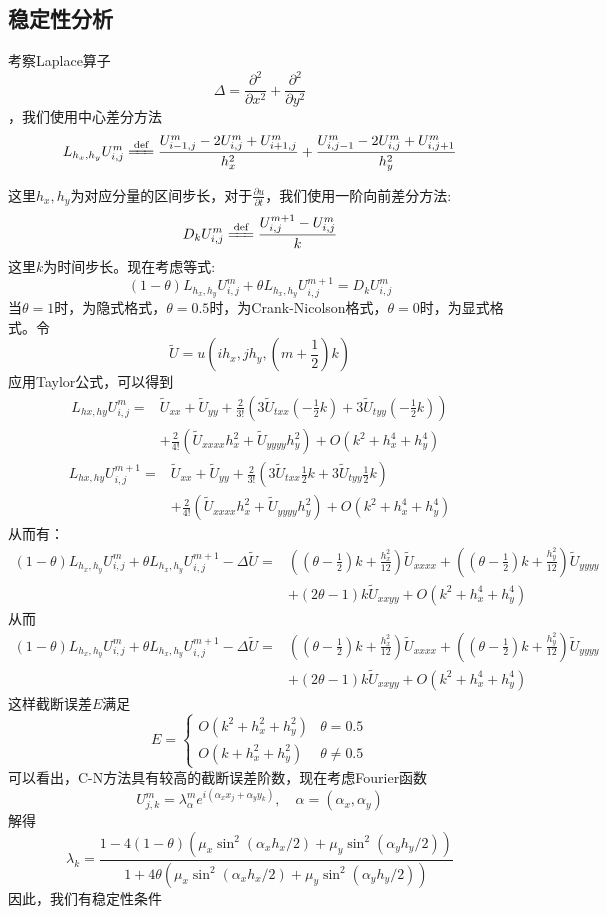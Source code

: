 \documentclass[12pt]{ctexart}
\newcommand{\eqdef}{\xlongequal{\text{def}}}%
\begin{document}
\subsection{稳定性分析}
考察Laplace算子$$\Delta = \frac{\partial^2}{\partial x^2} + \frac{\partial^2}{\partial y^2}$$，我们使用中心差分方法
$$
L_{h_x,h_y}U_{i,j}^m \eqdef \frac{U_{i-1,j}^m-2U_{i,j}^m+U_{i+1,j}^m}{h_x^2} + \frac{U_{i,j-1}^m-2U_{i,j}^m+U_{i,j+1}^m}{h_y^2}
$$

这里$h_x,h_y$为对应分量的区间步长，对于$\frac{\partial u}{\partial t}$，我们使用一阶向前差分方法:
$$
D_k U_{i,j}^m \eqdef \frac{U_{i,j}^{m+1}-U_{i,j}^m}{k}
$$
这里$k$为时间步长。现在考虑等式:
$$
(1-\theta)L_{h_x,h_y}U_{i,j}^m+\theta L_{h_x,h_y}U_{i,j}^{m+1} = D_kU_{i,j}^m
$$
当$\theta = 1$时，为隐式格式，$\theta=0.5$时，为Crank-Nicolson格式，$\theta=0$时，为显式格式。令
$$\tilde{U} = u\left(ih_x,jh_y,\left(m+\frac{1}{2}\right)k\right)$$
应用Taylor公式，可以得到
$$
\begin{aligned}
L_{hx,hy}U_{i,j}^m =& \tilde{U}_{xx} + \tilde{U}_{yy} + \frac{2}{3!}\left(3\tilde{U}_{txx}\left(-\frac{1}{2}k\right)+3\tilde{U}_{tyy}\left(-\frac{1}{2}k\right)\right) \\
&+\frac{2}{4!}\left(\tilde{U}_{xxxx}h_x^2+\tilde{U}_{yyyy}h_y^2\right)+O(k^2+h_x^4+h_y^4)
\end{aligned}
$$
$$
\begin{aligned}
L_{hx,hy}U_{i,j}^{m+1} =& \tilde{U}_{xx} + \tilde{U}_{yy} + \frac{2}{3!}\left(3\tilde{U}_{txx}\frac{1}{2}k+3\tilde{U}_{tyy}\frac{1}{2}k\right) \\
&+\frac{2}{4!}\left(\tilde{U}_{xxxx}h_x^2+\tilde{U}_{yyyy}h_y^2\right)+O(k^2+h_x^4+h_y^4)
\end{aligned}
$$
从而有：
$$
\begin{aligned}
(1-\theta)L_{h_x,h_y}U_{i,j}^m+\theta L_{h_x,h_y}U_{i,j}^{m+1} - \Delta \tilde{U} =& \left(\left(\theta - \frac{1}{2}\right)k+\frac{h_x^2}{12}\right)\tilde{U}_{xxxx}+\left(\left(\theta - \frac{1}{2}\right)k+\frac{h_y^2}{12}\right)\tilde{U}_{yyyy}\\
&+\left(2\theta - 1\right)k\tilde{U}_{xxyy} + O(k^2+h_x^4+h_y^4)
\end{aligned}
$$
从而
$$
\begin{aligned}
(1-\theta)L_{h_x,h_y}U_{i,j}^m+\theta L_{h_x,h_y}U_{i,j}^{m+1} - \Delta \tilde{U} =& \left(\left(\theta - \frac{1}{2}\right)k+\frac{h_x^2}{12}\right)\tilde{U}_{xxxx}+\left(\left(\theta - \frac{1}{2}\right)k+\frac{h_y^2}{12}\right)\tilde{U}_{yyyy}\\
&+\left(2\theta - 1\right)k\tilde{U}_{xxyy} + O(k^2+h_x^4+h_y^4)
\end{aligned}
$$
这样截断误差$E$满足
$$
E = 
\begin{cases}
O(k^2+h_x^2+h_y^2) & \theta = 0.5\\
O(k+h_x^2+h_y^2) & \theta \neq 0.5
\end{cases}
$$
可以看出，C-N方法具有较高的截断误差阶数，现在考虑Fourier函数
$$U_{j,k}^m =\lambda_{\alpha}^me^{i(\alpha_xx_j+\alpha_yy_k)},\quad \alpha = (\alpha_x, \alpha_y)$$
解得
$$
\lambda_k = \frac{1 - 4(1-\theta)\left(\mu_x\sin^2(\alpha_xh_x/2)+\mu_y\sin^2(\alpha_yh_y/2)\right)}{1+4\theta\left(\mu_x\sin^2(\alpha_xh_x/2)+\mu_y\sin^2(\alpha_yh_y/2)\right)}
$$
因此，我们有稳定性条件
\end{document}
